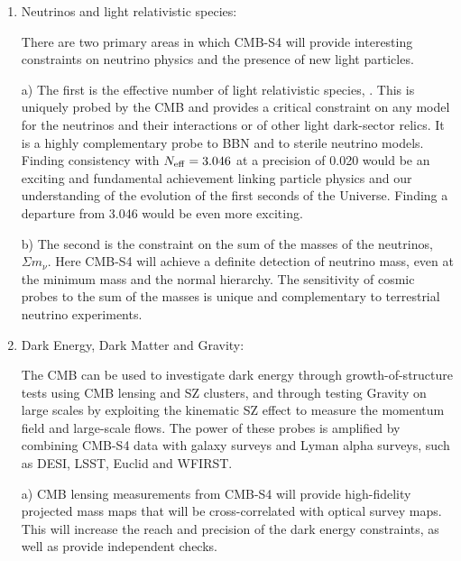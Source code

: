 \begin{enumerate}
\item{Neutrinos and light relativistic species:

There are two primary areas in which CMB-S4 will provide interesting constraints on neutrino physics and the presence of new light particles.


a) The first is the effective number of light relativistic species, \neff. This is uniquely probed by the CMB and provides a critical constraint on any model for the neutrinos and their interactions or of other light dark-sector relics. It is a highly complementary probe to BBN and to sterile neutrino models.  Finding consistency with $N_\mathrm{eff} = 3.046$ at a precision of 0.020 would be an exciting and fundamental achievement linking particle physics and our understanding of the evolution of the first seconds of the Universe. Finding a departure from 3.046 would be even more exciting. %

b) The second is the constraint on the sum of the masses of the neutrinos, $\Sigma m_\nu$. Here CMB-S4 will achieve %
a definite detection of neutrino mass, even at the minimum mass and the normal hierarchy. The sensitivity of cosmic probes to the sum of the masses is unique and complementary to terrestrial neutrino experiments.
 }

\item{Dark Energy, Dark Matter and Gravity:

 The CMB can be used to investigate dark energy through growth-of-structure tests using CMB lensing and SZ clusters, and through testing Gravity on large scales by exploiting the kinematic SZ effect to measure the momentum field and large-scale flows. The power of these probes is amplified by combining CMB-S4 data with galaxy surveys and Lyman alpha surveys, such as DESI, LSST, Euclid and WFIRST.

 a) CMB lensing measurements from CMB-S4 will provide high-fidelity projected mass maps that will be cross-correlated with optical survey maps. This will increase the reach and precision of the dark energy constraints, as well as provide independent checks. %

}
\end{enumerate}
